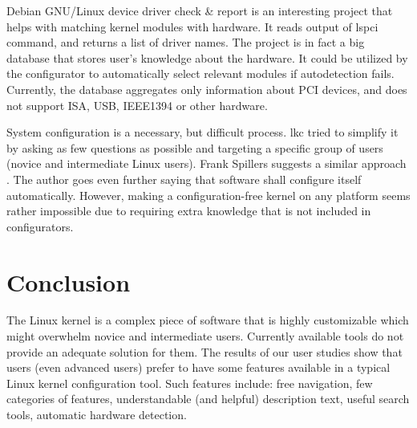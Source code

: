 \documentclass{chi2009}
\begin{document}
Debian GNU/Linux device driver check \& report \cite{muto:check:2010} is an interesting project that helps with matching kernel modules with hardware. It reads
output of \textsf{lspci} command, and returns a list of driver names. The project is in fact a big database that stores user's knowledge about the hardware. It
could be utilized by the configurator to automatically select relevant modules if autodetection fails. Currently, the database aggregates only information about
PCI devices, and does not support ISA, USB, IEEE1394 or other hardware.

System configuration is a necessary, but difficult process. \textsf{lkc} tried to simplify it by asking as few questions as possible and targeting a specific
group of users (novice and intermediate Linux users). Frank Spillers suggests a similar approach \cite{spillers:config:2010}. The author goes even further
saying that software shall configure itself automatically. However, making a configuration-free kernel on any platform seems rather impossible due to requiring
extra knowledge that is not included in configurators.

\section{Conclusion}\label{sec:conclusion}
The Linux kernel is a complex piece of software that is highly customizable which might overwhelm novice and intermediate users. Currently available tools do
not provide an adequate solution for them. The results of our user studies show that users (even advanced users) prefer to have some features available in a
typical Linux kernel configuration tool. Such features include: free navigation, few categories of features, understandable (and helpful) description text,
useful search tools, automatic hardware detection.



\end{document}
